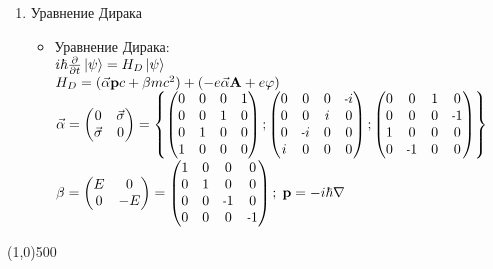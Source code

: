 \begin{enumerate}[label=\textbf{\underline{\arabic*.}}]
\begin{itemize}
        \end{itemize}
\item Уравнение Дирака  \begin{itemize}
            \item Уравнение Дирака: \\
            $ i\hbar\frac{\partial }{\partial t}\left| \psi \right> = H_D\left| \psi \right> $ \\
            $ H_D = (\vec{\alpha}\mathbf{p}c+\beta mc^2)+(-e\vec{\alpha}\mathbf{A}+e\varphi) $\\
            $ \vec{\alpha} = \begin{pmatrix} 0 & \vec{\sigma} \\ \vec{\sigma} & 0 \end{pmatrix} =
            \left\{
                \begin{pmatrix}0&0&0&1\\0&0&1&0\\0&1&0&0\\1&0&0&0\end{pmatrix};
                \begin{pmatrix}0&0&0&\scalebox{0.75}[1.0]{-}i\\0&0&i&0\\0&\scalebox{0.75}[1.0]{-}i&0&0\\i&0&0&0\end{pmatrix};
                \begin{pmatrix}0&0&1&0\\0&0&0&\scalebox{0.75}[1.0]{-}1\\1&0&0&0\\0&\scalebox{0.75}[1.0]{-}1&0&0\end{pmatrix}
            \right\} $ \\
            $\beta = \begin{pmatrix} E & 0 \\ 0 & -E \end{pmatrix} =
            \begin{pmatrix}1&0&0&0\\0&1&0&0\\0&0&\scalebox{0.75}[1.0]{-}1&0\\0&0&0&\scalebox{0.75}[1.0]{-}1\end{pmatrix};\;
            \v{p} = -i\hbar\nabla $

        \end{itemize}
\end{enumerate}
\vfill\line(1,0){500}

